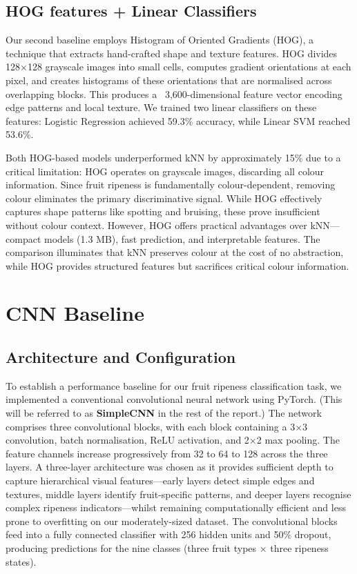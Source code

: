 \documentclass[11pt,a4paper]{article}
\begin{document}
\subsection{HOG features + Linear Classifiers}
Our second baseline employs Histogram of Oriented Gradients (HOG), a  technique that extracts hand-crafted shape and texture features. HOG divides 128×128 grayscale images into small cells, computes gradient orientations at each pixel, and creates histograms of these orientations that are normalised across overlapping blocks. This produces a ~3,600-dimensional feature vector encoding edge patterns and local texture. We trained two linear classifiers on these features: Logistic Regression achieved 59.3\% accuracy, while Linear SVM reached 53.6\%.

Both HOG-based models underperformed kNN by approximately 15\% due to a critical limitation: HOG operates on grayscale images, discarding all colour information. Since fruit ripeness is fundamentally colour-dependent, removing colour eliminates the primary discriminative signal. While HOG effectively captures shape patterns like spotting and bruising, these prove insufficient without colour context. However, HOG offers practical advantages over kNN—compact models (1.3 MB), fast prediction, and interpretable features. The comparison illuminates that kNN preserves colour at the cost of no abstraction, while HOG provides structured features but sacrifices critical colour information.

\section{CNN Baseline}

\subsection{Architecture and Configuration}
To establish a performance baseline for our fruit ripeness classification task, we implemented a conventional convolutional neural network using PyTorch. (This will be referred to as \textbf{SimpleCNN} in the rest of the report.) The network comprises three convolutional blocks, with each block containing a 3×3 convolution, batch normalisation, ReLU activation, and 2×2 max pooling. The feature channels increase progressively from 32 to 64 to 128 across the three layers. A three-layer architecture was chosen as it provides sufficient depth to capture hierarchical visual features—early layers detect simple edges and textures, middle layers identify fruit-specific patterns, and deeper layers recognise complex ripeness indicators—whilst remaining computationally efficient and less prone to overfitting on our moderately-sized dataset. The convolutional blocks feed into a fully connected classifier with 256 hidden units and 50\% dropout, producing predictions for the nine classes (three fruit types × three ripeness states).
\end{document}
